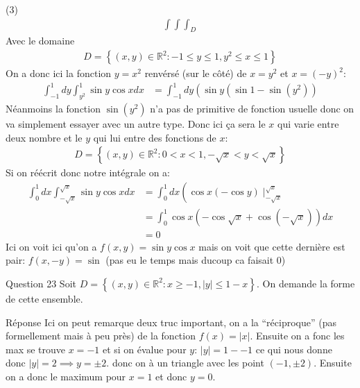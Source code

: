 \begin{parag}{(3)}
    \begin{align*} \int\int\int_D \end{align*}
    Avec le domaine 
    \begin{align*} 
        D =  \left\{\left(x, y\right)\in \mathbb{R}^{2}: -1 \leq y \leq 1, y^2 \leq x \leq 1\right\}
    \end{align*}
    On a donc ici la fonction $y =  x^2$ renvérsé (sur le côté) de $x =  y^2$ et $x =  \left(-y\right)^2$:
    \begin{align*} 
        \int_{-1}^1 dy \int_{y^2}^1 \sin y \cos x dx &=\int_{-1}^1dy\left(\sin y\left( \sin 1 - \sin\left(y^2\right)\right)
    \end{align*}
    Néanmoins la fonction $\sin\left(y^2\right)$ n'a pas de primitive de fonction usuelle donc on va simplement essayer avec un autre type. Donc ici ça sera le $x$ qui varie entre deux nombre et le $y$ qui lui entre des fonctions de $x$:
    \begin{align*} 
        D =  \left\{\left(x, y \right) \in \mathbb{R}^{2}: 0 < x < 1, -\sqrt{x} < y <\sqrt{x}\right\}
    \end{align*}
    Si on réécrit donc notre intégrale on a:
    \begin{align*} 
        \int_0^1 dx \int_{-\sqrt{x}}^{\sqrt{x}}\sin y \cos x dx &= \int_0^1dx \left(\cos x \left(-\cos y\right)\mid_{-\sqrt{x}}^{\sqrt{x}}\\
                                                                &= \int_0^1 \cos x \left(-\cos \sqrt{x} + \cos \left(-\sqrt{x}\right)\right)dx\\
                                                                &= 0
    \end{align*}
    Ici on voit ici qu'on a $f\left(x, y\right) =  \sin y \cos x$ mais on voit que cette dernière est pair: $f\left(x, -y\right) = \sin$ (pas eu le temps mais ducoup ca faisait 0)
\end{parag}
\begin{parag}{Question 23}
    Soit $D =  \left\{\left(x, y\right)\in \mathbb{R}^{2}: x \geq -1, \left|y\right| \leq 1 - x\right\}$. On demande la forme de cette ensemble.\\
    \begin{subparag}{Réponse}
        Ici on peut remarque deux truc important, on a la ``réciproque'' (pas formellement mais à peu près) de la fonction $f\left(x\right) =  \left|x\right|$. Ensuite on a fonc les max se trouve $ x =  -1$ et si on évalue pour $y$: $\left|y\right| = 1 - - 1$ ce qui nous donne donc $\left|y\right|= 2 \implies  y =\pm 2$. donc on à un triangle avec les point $\left(-1, \pm 2\right)$. Ensuite on a donc le maximum pour $x =  1$ et donc $y =  0$. 
    \end{subparag}
\end{parag}

